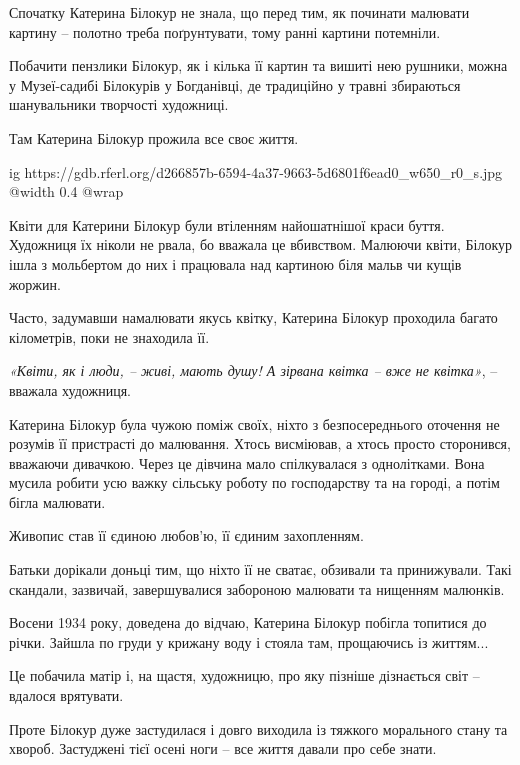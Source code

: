 Спочатку Катерина Білокур не знала, що перед тим, як починати малювати картину
– полотно треба поґрунтувати, тому ранні картини потемніли.

Побачити пензлики Білокур, як і кілька її картин та вишиті нею рушники, можна у
Музеї-садибі Білокурів у Богданівці, де традиційно у травні збираються
шанувальники творчості художниці.

Там Катерина Білокур прожила все своє життя.



\ifcmt
  ig https://gdb.rferl.org/d266857b-6594-4a37-9663-5d6801f6ead0_w650_r0_s.jpg
  @width 0.4
  @wrap 
\fi

Квіти для Катерини Білокур були втіленням найошатнішої краси буття. Художниця
їх ніколи не рвала, бо вважала це вбивством. Малюючи квіти, Білокур ішла з
мольбертом до них і працювала над картиною біля мальв чи кущів жоржин.

Часто, задумавши намалювати якусь квітку, Катерина Білокур проходила багато
кілометрів, поки не знаходила її.

{\em «Квіти, як і люди, – живі, мають душу! А зірвана квітка – вже не квітка»},
– вважала художниця.


Катерина Білокур була чужою поміж своїх, ніхто з безпосереднього оточення не
розумів її пристрасті до малювання. Хтось висміював, а хтось просто сторонився,
вважаючи дивачкою. Через це дівчина мало спілкувалася з однолітками. Вона
мусила робити усю важку сільську роботу по господарству та на городі, а потім
бігла малювати.

Живопис став її єдиною любов'ю, її єдиним захопленням.

Батьки дорікали доньці тим, що ніхто її не сватає, обзивали та принижували.
Такі скандали, зазвичай, завершувалися забороною малювати та нищенням малюнків.

Восени 1934 року, доведена до відчаю, Катерина Білокур побігла топитися до
річки. Зайшла по груди у крижану воду і стояла там, прощаючись із життям...

Це побачила матір і, на щастя, художницю, про яку пізніше дізнається світ –
вдалося врятувати.

Проте Білокур дуже застудилася і довго виходила із тяжкого морального стану та
хвороб. Застуджені тієї осені ноги – все життя давали про себе знати.

